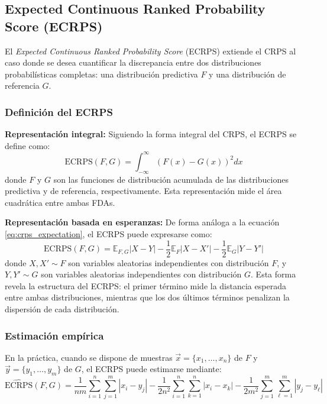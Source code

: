 \subsection{Expected Continuous Ranked Probability Score (ECRPS)}
\label{subsec:ecrps}

El \textit{Expected Continuous Ranked Probability Score} (ECRPS) extiende el CRPS al caso donde se desea cuantificar la discrepancia entre dos distribuciones probabilísticas completas: una distribución predictiva $F$ y una distribución de referencia $G$.

\subsubsection{Definición del ECRPS}

\textbf{Representación integral:} Siguiendo la forma integral del CRPS, el ECRPS se define como:
\begin{equation}
\text{ECRPS}(F, G) = \int_{-\infty}^{\infty} \left(F(x) - G(x)\right)^2 dx
\label{eq:ecrps_integral}
\end{equation}
donde $F$ y $G$ son las funciones de distribución acumulada de las distribuciones predictiva y de referencia, respectivamente. Esta representación mide el área cuadrática entre ambas FDAs.

\textbf{Representación basada en esperanzas:} De forma análoga a la ecuación \eqref{eq:crps_expectation}, el ECRPS puede expresarse como:
\begin{equation}
\text{ECRPS}(F, G) = \mathbb{E}_{F,G}|X - Y| - \frac{1}{2}\mathbb{E}_F|X - X'| - \frac{1}{2}\mathbb{E}_G|Y - Y'|
\label{eq:ecrps_expectation}
\end{equation}
donde $X, X' \sim F$ son variables aleatorias independientes con distribución $F$, y $Y, Y' \sim G$ son variables aleatorias independientes con distribución $G$. Esta forma revela la estructura del ECRPS: el primer término mide la distancia esperada entre ambas distribuciones, mientras que los dos últimos términos penalizan la dispersión de cada distribución.

\subsubsection{Estimación empírica}

En la práctica, cuando se dispone de muestras $\vec{x} = \{x_1, \ldots, x_n\}$ de $F$ y $\vec{y} = \{y_1, \ldots, y_m\}$ de $G$, el ECRPS puede estimarse mediante:
\begin{equation}
\widehat{\text{ECRPS}}(F, G) = \frac{1}{nm}\sum_{i=1}^n\sum_{j=1}^m |x_i - y_j| - \frac{1}{2n^2}\sum_{i=1}^n\sum_{k=1}^n |x_i - x_k| - \frac{1}{2m^2}\sum_{j=1}^m\sum_{\ell=1}^m |y_j - y_\ell|
\label{eq:ecrps_empirical}
\end{equation}

